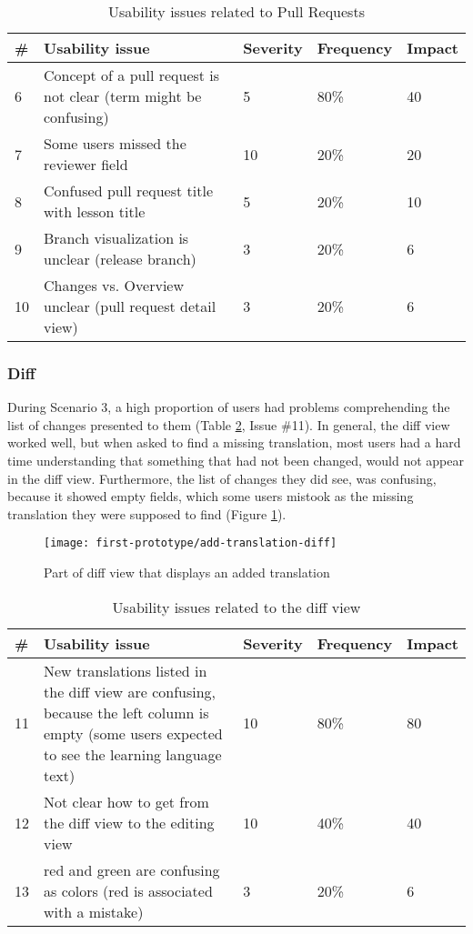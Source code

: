 \begin{table}[h!]
\centering
\begin{tabular}{|l|p{7cm}|l|l|l|}
\hline
\rowcolor[HTML]{EFEFEF}
\textbf{\#} & \textbf{Usability issue} & \textbf{Severity} & \textbf{Frequency} & \textbf{Impact} \\ \hline
6 & Concept of a pull request is not clear (term might be confusing) & 5 & 80\% & 40 \\ \hline
7 & Some users missed the reviewer field & 10 & 20\% & 20 \\ \hline
8 & Confused pull request title with lesson title & 5 & 20\% & 10 \\ \hline
9 & Branch visualization is unclear (release branch) & 3 & 20\% & 6 \\ \hline
10 & Changes vs. Overview unclear (pull request detail view) & 3 & 20\% & 6 \\ \hline
\end{tabular}
\caption{Usability issues related to Pull Requests}
\label{table:issues-pull-requests}
\end{table}

\subsubsection{Diff}
During Scenario 3, a high proportion of users had problems comprehending the list of changes presented to them (Table \ref{table:issues-diff}, Issue \#11). In general, the diff view worked well, but when asked to find a missing translation, most users had a hard time understanding that something that had not been changed, would not appear in the diff view. Furthermore, the list of changes they did see, was confusing, because it showed empty fields, which some users mistook as the missing translation they were supposed to find (Figure \ref{fig:add-translation-diff}).

\begin{figure}[h!]
 \centering
 \texttt{[image: first-prototype/add-translation-diff]}
 \caption{Part of diff view that displays an added translation}
 \label{fig:add-translation-diff}
\end{figure}

\begin{table}[h!]
\centering
\begin{tabular}{|l|p{7cm}|l|l|l|}
\hline
\rowcolor[HTML]{EFEFEF}
\textbf{\#} & \textbf{Usability issue} & \textbf{Severity} & \textbf{Frequency} & \textbf{Impact} \\ \hline
11 & New translations listed in the diff view are confusing, because the left column is empty (some users expected to see the learning language text) & 10 & 80\% & 80 \\ \hline
12 & Not clear how to get from the diff view to the editing view & 10 & 40\% & 40 \\ \hline
13 & red and green are confusing as colors (red is associated with a mistake) & 3 & 20\% & 6 \\ \hline
\end{tabular}
\caption{Usability issues related to the diff view}
\label{table:issues-diff}
\end{table}


